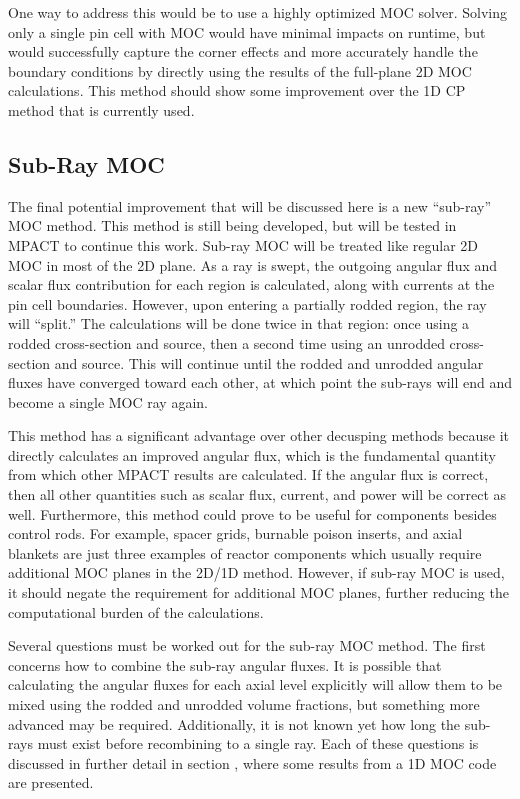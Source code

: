 One way to address this would be to use a highly optimized MOC solver.  Solving only a single pin cell with MOC would have minimal impacts on runtime, but would successfully capture the corner effects and more accurately handle the boundary conditions by directly using the results of the full-plane 2D MOC calculations.  This method should show some improvement over the 1D CP method that is currently used.

\subsection{Sub-Ray MOC}

The final potential improvement that will be discussed here is a new ``sub-ray'' MOC method.  This method is still being developed, but will be tested in MPACT to continue this work.  Sub-ray MOC will be treated like regular 2D MOC in most of the 2D plane.  As a ray is swept, the outgoing angular flux and scalar flux contribution for each region is calculated, along with currents at the pin cell boundaries.  However, upon entering a partially rodded region, the ray will ``split.''  The calculations will be done twice in that region: once using a rodded cross-section and source, then a second time using an unrodded cross-section and source.  This will continue until the rodded and unrodded angular fluxes have converged toward each other, at which point the sub-rays will end and become a single MOC ray again.

This method has a significant advantage over other decusping methods because it directly calculates an improved angular flux, which is the fundamental quantity from which other MPACT results are calculated.  If the angular flux is correct, then all other quantities such as scalar flux, current, and power will be correct as well.  Furthermore, this method could prove to be useful for components besides control rods.  For example, spacer grids, burnable poison inserts, and axial blankets are just three examples of reactor components which usually require additional MOC planes in the 2D/1D method.  However, if sub-ray MOC is used, it should negate the requirement for additional MOC planes, further reducing the computational burden of the calculations.

Several questions must be worked out for the sub-ray MOC method.  The first concerns how to combine the sub-ray angular fluxes.  It is possible that calculating the angular fluxes for each axial level explicitly will allow them to be mixed using the rodded and unrodded volume fractions, but something more advanced may be required.  Additionally, it is not known yet how long the sub-rays must exist before recombining to a single ray.  Each of these questions is discussed in further detail in section , where some results from a 1D MOC code are presented.


